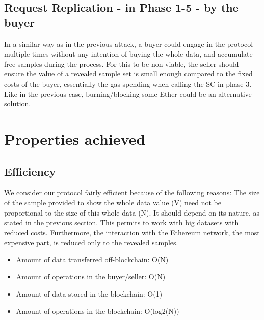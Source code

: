 \documentclass[]{article}
\begin{document}
\subsection{Request Replication - in Phase 1-5 - by the buyer}
In a similar way as in the previous attack, a buyer could engage in the protocol multiple times without any intention of buying the whole data, and accumulate free samples during the process. For this to be non-viable, the seller should ensure the value of a revealed sample set is small enough compared to the fixed costs of the buyer, essentially the gas spending when calling the SC in phase 3.
Like in the previous case, burning/blocking some Ether could be an alternative solution.


\section{Properties achieved}
\subsection {Efficiency}
We consider our protocol fairly efficient because of the following reasons:
The size of the sample provided to show the whole data value (V) need not be proportional to the size of this whole data (N). It should depend on its nature, as stated in the previous section. This permits to work with big datasets with reduced costs. Furthermore, the interaction with the Ethereum network, the most expensive part, is reduced only to the revealed samples.
\begin{itemize}
\item Amount of data transferred off-blockchain: O(N)
\item Amount of operations in the buyer/seller: O(N)
\item Amount of data stored in the blockchain: O(1)
\item Amount of operations in the blockchain: O(log2(N))
\end{itemize}
\end{document}
